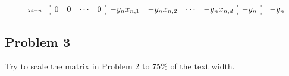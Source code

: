 \documentclass{article}
\begin{document}
\[\begin{array}{rl@{}:cccc:cccc:c:@{}r r@{}c@{}l}
        \scriptscriptstyle{2d+n} &                                                                                            & 0              & 0      & \cdots & 0              & -y_nx_{n, 1}      & -y_nx_{n, 2} & \cdots & -y_nx_{n, d}     & -y_n               &                                                                                            &                                                                                            & -y_n                                                                                                \\
    \end{array}
\]

\subsection{Problem 3}
Try to scale the matrix in Problem 2 to 75\% of the text width.
\end{document}
